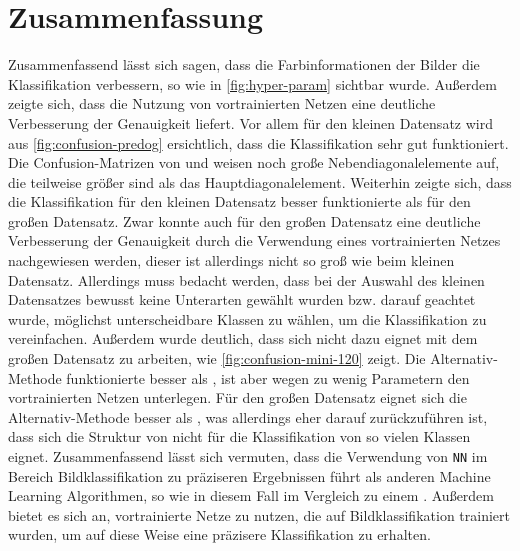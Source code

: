 \section{Zusammenfassung}
Zusammenfassend lässt sich sagen, dass die Farbinformationen der Bilder die
Klassifikation verbessern, so wie in \autoref{fig:hyper-param} sichtbar wurde.
Außerdem zeigte sich, dass die Nutzung von vortrainierten Netzen eine deutliche
Verbesserung der Genauigkeit liefert. Vor allem für den kleinen Datensatz wird
aus \autoref{fig:confusion-predog} ersichtlich, dass die Klassifikation sehr gut
funktioniert. Die Confusion-Matrizen von \MiniDog{} und \RF{} weisen noch große
Nebendiagonalelemente auf, die teilweise größer sind als das
Hauptdiagonalelement. Weiterhin zeigte sich, dass die Klassifikation für den kleinen Datensatz besser
funktionierte als für den großen Datensatz. Zwar konnte auch für den großen
Datensatz eine deutliche Verbesserung der Genauigkeit durch die Verwendung eines
vortrainierten Netzes nachgewiesen werden, dieser ist allerdings nicht so groß
wie beim kleinen Datensatz. Allerdings muss bedacht werden, dass bei der Auswahl
des kleinen Datensatzes bewusst keine Unterarten gewählt wurden bzw. darauf
geachtet wurde, möglichst unterscheidbare Klassen zu wählen, um die
Klassifikation zu vereinfachen. Außerdem wurde deutlich, dass sich \MiniDog{}
nicht dazu eignet mit dem großen Datensatz zu arbeiten, wie
\autoref{fig:confusion-mini-120} zeigt. Die Alternativ-Methode funktionierte besser als \MiniDog{}, ist aber wegen zu
wenig Parametern den vortrainierten Netzen unterlegen. Für den großen Datensatz
eignet sich die Alternativ-Methode besser als \MiniDog{}, was allerdings eher
darauf zurückzuführen ist, dass sich die Struktur von \MiniDog{} nicht für die
Klassifikation von so vielen Klassen eignet. Zusammenfassend lässt sich vermuten, dass die Verwendung von \texttt{NN} im
Bereich Bildklassifikation zu präziseren Ergebnissen führt als anderen Machine Learning
Algorithmen, so wie in diesem Fall im Vergleich zu einem \RF{}. Außerdem bietet es sich an,
vortrainierte Netze zu nutzen, die auf Bildklassifikation trainiert
wurden, um auf diese Weise eine präzisere Klassifikation zu erhalten.
